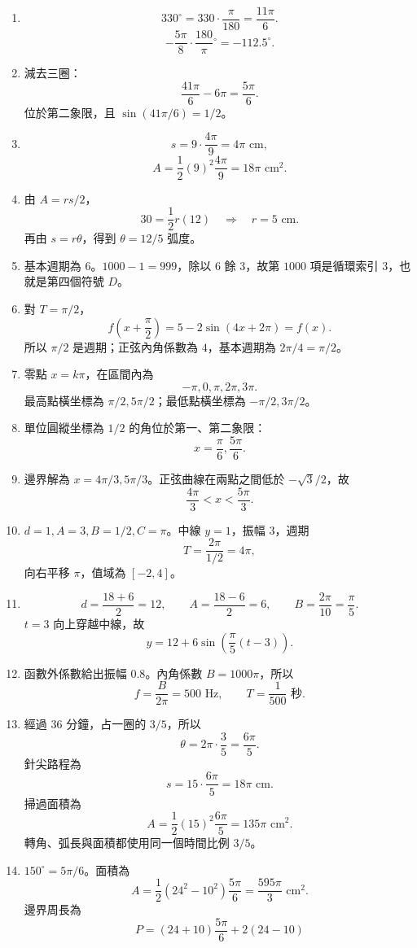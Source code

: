 \documentclass[11pt,a4paper]{article}
\providecommand{\tightlist}{%
  \setlength{\itemsep}{0pt}\setlength{\parskip}{0pt}}
\begin{document}
\begin{enumerate}
\def\labelenumi{\arabic{enumi}.}
\tightlist
\item
  \[330^\circ=330\cdot\frac\pi{180}=\frac{11\pi}{6}.\]
  \[-\frac{5\pi}{8}\cdot\frac{180}{\pi}{}^\circ=-112.5^\circ.\]
\item
  減去三圈：
  \[\frac{41\pi}{6}-6\pi=\frac{5\pi}{6}.\]
  位於第二象限，且 \(\sin(41\pi/6)=1/2\)。
\item
  \[s=9\cdot\frac{4\pi}{9}=4\pi\text{ cm},\]
  \[A=\frac12(9)^2\frac{4\pi}{9}=18\pi\text{ cm}^2.\]
\item
  由 \(A=rs/2\)，
  \[30=\frac12r(12)\quad\Rightarrow\quad r=5\text{ cm}.\]
  再由 \(s=r\theta\)，得到 \(\theta=12/5\) 弧度。
\item
  基本週期為 \(6\)。\(1000-1=999\)，除以 \(6\) 餘 \(3\)，故第 \(1000\) 項是循環索引 \(3\)，也就是第四個符號 \(D\)。
\item
  對 \(T=\pi/2\)，
  \[f\left(x+\frac\pi2\right)=5-2\sin(4x+2\pi)=f(x).\]
  所以 \(\pi/2\) 是週期；正弦內角係數為 \(4\)，基本週期為 \(2\pi/4=\pi/2\)。
\item
  零點 \(x=k\pi\)，在區間內為
  \[-\pi,0,\pi,2\pi,3\pi.\]
  最高點橫坐標為 \(\pi/2,5\pi/2\)；最低點橫坐標為 \(-\pi/2,3\pi/2\)。
\item
  單位圓縱坐標為 \(1/2\) 的角位於第一、第二象限：
  \[x=\frac\pi6,\frac{5\pi}{6}.\]
\item
  邊界解為 \(x=4\pi/3,5\pi/3\)。正弦曲線在兩點之間低於 \(-\sqrt3/2\)，故
  \[\frac{4\pi}{3}<x<\frac{5\pi}{3}.\]
\item
  \(d=1,A=3,B=1/2,C=\pi\)。中線 \(y=1\)，振幅 \(3\)，週期
  \[T=\frac{2\pi}{1/2}=4\pi,\]
  向右平移 \(\pi\)，值域為 \([-2,4]\)。
\item
  \[d=\frac{18+6}{2}=12,\qquad A=\frac{18-6}{2}=6,\qquad
  B=\frac{2\pi}{10}=\frac\pi5.\]
  \(t=3\) 向上穿越中線，故
  \[y=12+6\sin\left(\frac\pi5(t-3)\right).\]
\item
  函數外係數給出振幅 \(0.8\)。內角係數 \(B=1000\pi\)，所以
  \[f=\frac{B}{2\pi}=500\text{ Hz},\qquad T=\frac1{500}\text{ 秒}.\]
\item
  經過 \(36\) 分鐘，占一圈的 \(3/5\)，所以
  \[\theta=2\pi\cdot\frac35=\frac{6\pi}{5}.\]
  針尖路程為
  \[s=15\cdot\frac{6\pi}{5}=18\pi\text{ cm}.\]
  掃過面積為
  \[A=\frac12(15)^2\frac{6\pi}{5}=135\pi\text{ cm}^2.\]
  轉角、弧長與面積都使用同一個時間比例 \(3/5\)。
\item
  \(150^\circ=5\pi/6\)。面積為
  \[A=\frac12(24^2-10^2)\frac{5\pi}{6}
  =\frac{595\pi}{3}\text{ cm}^2.\]
  邊界周長為
  \[P=(24+10)\frac{5\pi}{6}+2(24-10)
\]
\end{enumerate}
\end{document}
